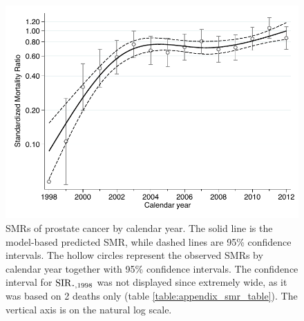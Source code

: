 \begin{figure}[hb]
\centering
\includegraphics[width=\linewidth]{figures/smr_cy.pdf}
\caption[Standardized Mortality Ratios of prostate cancer by calendar year]{SMRs of prostate cancer by calendar year. The solid line is the model-based predicted SMR, while dashed lines are 95\% confidence intervals. The hollow circles represent the observed SMRs by calendar year together with 95\% confidence intervals. The confidence interval for $\SIR_{\LargerCdot, 1998}$ was not displayed since extremely wide, as it was based on 2 deaths only (table \ref{table:appendix_smr_table}). The vertical axis is on the natural log scale.}
\label{fig:smr_cy}
\end{figure}



